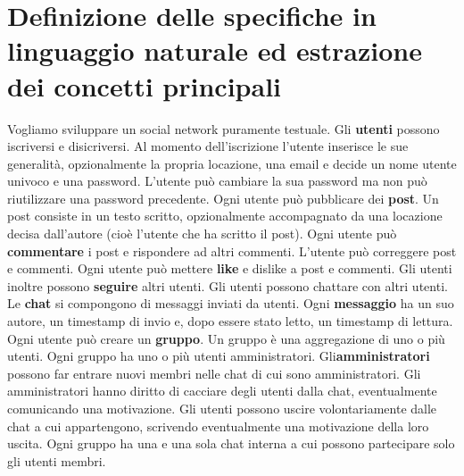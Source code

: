 \documentclass[a4paper,12pt]{report}
\begin{document}
\section{Definizione delle specifiche in linguaggio naturale ed estrazione dei concetti principali}
Vogliamo sviluppare un social network puramente testuale.
Gli \textbf{utenti} possono iscriversi e disicriversi. Al momento dell'iscrizione l'utente inserisce le sue generalità, opzionalmente la propria locazione, una email e decide un nome utente univoco e una password.
L'utente può cambiare la sua password ma non può riutilizzare una password precedente.
Ogni utente può pubblicare dei \textbf{post}. Un post consiste in un testo scritto, opzionalmente accompagnato da una locazione decisa dall'autore (cioè l'utente che ha scritto il post).
Ogni utente può \textbf{commentare} i post e rispondere ad altri commenti.
L'utente può correggere post e commenti.
Ogni utente può mettere \textbf{like} e dislike a post e commenti.
Gli utenti inoltre possono \textbf{seguire} altri utenti.
Gli utenti possono chattare con altri utenti. Le \textbf{chat} si compongono di messaggi inviati da utenti. Ogni \textbf{messaggio} ha un suo autore, un timestamp di invio e, dopo essere stato letto, un timestamp di lettura.
Ogni utente può creare un \textbf{gruppo}. Un gruppo è una aggregazione di uno o più utenti. Ogni gruppo ha uno o più utenti amministratori. Gli\textbf{amministratori} possono far entrare nuovi membri nelle chat di cui sono amministratori. Gli amministratori hanno diritto di cacciare degli utenti dalla chat, eventualmente comunicando una motivazione. Gli utenti possono uscire volontariamente dalle chat a cui appartengono, scrivendo eventualmente una motivazione della loro uscita.
Ogni gruppo ha una e una sola chat interna a cui possono partecipare solo gli utenti membri.
\end{document}
